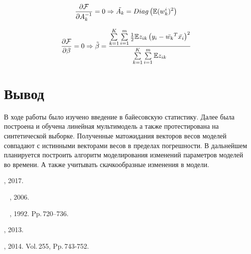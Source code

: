 \documentclass[12pt,twoside]{article}
\begin{document}
$$\frac{\partial \mathcal{F}}{\partial A_k^{-1}} = 0 \Rightarrow \Tilde{A_k} = Diag\left(\mathbb{E} (w_k^i)^2\right)$$

$$\frac{\partial \mathcal{F}}{\partial \beta} = 0 \Rightarrow \Tilde{\beta}  =  \frac{\sum \limits_{k=1}^{K} \sum \limits_{i=1}^{m} \frac{1}{2} \mathbb{E}z_{ik} \left(y_i - \bar{w_k}^T \bar{x_i} \right)^2}{\sum \limits_{k=1}^{K} \sum \limits_{i=1}^{m} \mathbb{E}z_{ik}}$$

\section{Вывод}
В ходе работы было изучено введение в байесовскую статистику. Далее была построена и обучена линейная мультимодель а также протестирована на синтетической выборке. Полученные матожидания векторов весов моделей совпадают с истинными векторами весов в пределах погрешности. В дальнейшем планируется построить алгоритм моделирования изменений параметров моделей во времени. А также учитывать скачкообразные изменения в модели.\\


\begin{thebibliography}{99}
    , 2017.

    ~
    , 2006.

    ~
    , 1992. Pp.\,720--736.

    , 2013.

    , 2014. Vol.\,255, Pp.\,743-752.
\end{thebibliography}
\end{document}
